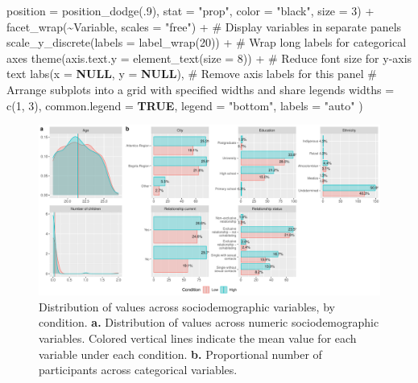 \documentclass[
  bookmarksnumbered]{article}
\newenvironment{Shaded}{\begin{snugshade}}{\end{snugshade}}
\newcommand{\AttributeTok}[1]{\textcolor[rgb]{0.80,0.80,0.80}{#1}}
\newcommand{\CommentTok}[1]{\textcolor[rgb]{0.50,0.62,0.50}{#1}}
\newcommand{\ConstantTok}[1]{\textcolor[rgb]{0.86,0.64,0.64}{\textbf{#1}}}
\newcommand{\DecValTok}[1]{\textcolor[rgb]{0.86,0.86,0.80}{#1}}
\newcommand{\FunctionTok}[1]{\textcolor[rgb]{0.94,0.94,0.56}{#1}}
\newcommand{\NormalTok}[1]{\textcolor[rgb]{0.80,0.80,0.80}{#1}}
\newcommand{\SpecialCharTok}[1]{\textcolor[rgb]{0.86,0.64,0.64}{#1}}
\newcommand{\StringTok}[1]{\textcolor[rgb]{0.80,0.58,0.58}{#1}}
\begin{document}
\begin{Shaded}
\begin{Highlighting}[]
                \AttributeTok{position =} \FunctionTok{position\_dodge}\NormalTok{(.}\DecValTok{9}\NormalTok{),}
                \AttributeTok{stat =} \StringTok{"prop"}\NormalTok{,}
                \AttributeTok{color =} \StringTok{"black"}\NormalTok{,}
                \AttributeTok{size =} \DecValTok{3}\NormalTok{) }\SpecialCharTok{+}
    \FunctionTok{facet\_wrap}\NormalTok{(}\SpecialCharTok{\textasciitilde{}}\NormalTok{Variable, }\AttributeTok{scales =} \StringTok{"free"}\NormalTok{) }\SpecialCharTok{+}  \CommentTok{\# Display variables in separate panels}
    \FunctionTok{scale\_y\_discrete}\NormalTok{(}\AttributeTok{labels =} \FunctionTok{label\_wrap}\NormalTok{(}\DecValTok{20}\NormalTok{)) }\SpecialCharTok{+}  \CommentTok{\# Wrap long labels for categorical axes}
    \FunctionTok{theme}\NormalTok{(}\AttributeTok{axis.text.y =} \FunctionTok{element\_text}\NormalTok{(}\AttributeTok{size =} \DecValTok{8}\NormalTok{)) }\SpecialCharTok{+}  \CommentTok{\# Reduce font size for y{-}axis text}
    \FunctionTok{labs}\NormalTok{(}\AttributeTok{x =} \ConstantTok{NULL}\NormalTok{, }\AttributeTok{y =} \ConstantTok{NULL}\NormalTok{),  }\CommentTok{\# Remove axis labels for this panel}
  \CommentTok{\# Arrange subplots into a grid with specified widths and share legends}
  \AttributeTok{widths =} \FunctionTok{c}\NormalTok{(}\DecValTok{1}\NormalTok{, }\DecValTok{3}\NormalTok{),}
  \AttributeTok{common.legend =} \ConstantTok{TRUE}\NormalTok{,}
  \AttributeTok{legend =} \StringTok{"bottom"}\NormalTok{,}
  \AttributeTok{labels =} \StringTok{"auto"}
\NormalTok{)}
\end{Highlighting}
\end{Shaded}

\begin{figure}
\centering
\includegraphics{Supplementary_material_files/figure-latex/sociodemographic-desc-plot-1.pdf}
\caption{\label{fig:sociodemographic-desc-plot}Distribution of values across sociodemographic variables, by condition. \textbf{a.} Distribution of values across numeric sociodemographic variables. Colored vertical lines indicate the mean value for each variable under each condition. \textbf{b.} Proportional number of participants across categorical variables.}
\end{figure}
\end{document}
